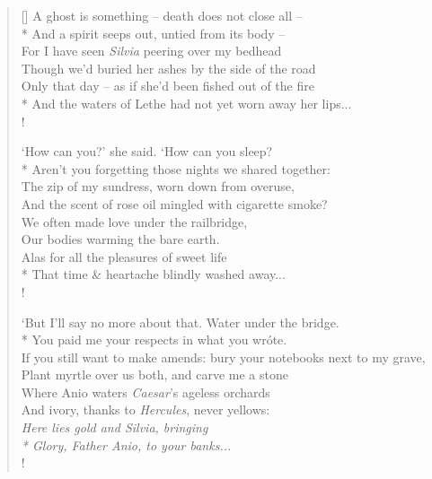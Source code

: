 \begin{verse}[\versewidth]
A ghost is something -- death does not close all --\\*
\vin And a spirit seeps out, untied from its body --\\
For I have seen \emph{Silvia} peering over my bedhead\\
\vin Though we'd buried her ashes by the side of the road\\
Only that day -- as if she'd been fished out of the fire\\*
\vin And the waters of {\sc Lethe} had not yet worn away her lips...\\!

`How can you?' she said. `How can you sleep?\\*
\vin Aren't you forgetting those nights we shared together:\\
The zip of my sundress, worn down from overuse,\\
\vin And the scent of rose oil mingled with cigarette smoke?\\
We often made love under the railbridge,\\
\vin Our bodies warming the bare earth.\\
Alas for all the pleasures of sweet life\\*
\vin That time \& heartache blindly washed away...\\!

`But I'll say no more about that. Water under the bridge.\\*
\vin You paid me your respects in what you wr\'ote.\\
If you still want to make amends: bury your notebooks next to my grave,\\
\vin Plant myrtle over us both, and carve me a stone\\
Where {\sc Anio} waters \emph{Caesar}'s ageless orchards\\
\vin And ivory, thanks to \emph{Hercules}, never yellows:\\
{\it Here lies gold and \emph{Silvia}, bringing\\*
\vin Glory, Father {\sc Anio}, to your banks...}\\!


\end{verse}
